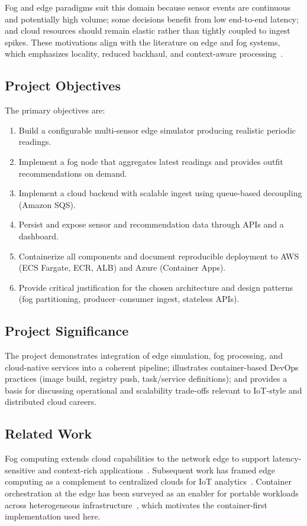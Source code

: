 \documentclass[conference]{IEEEtran}
\begin{document}
Fog and edge paradigms suit this domain because sensor events are continuous and potentially high volume; some decisions benefit from low end-to-end latency; and cloud resources should remain elastic rather than tightly coupled to ingest spikes. These motivations align with the literature on edge and fog systems, which emphasizes locality, reduced backhaul, and context-aware processing~\cite{bonomi2012,shi2016}.

\subsection{Project Objectives}
The primary objectives are:
\begin{enumerate}
  \item Build a configurable multi-sensor edge simulator producing realistic periodic readings.
  \item Implement a fog node that aggregates latest readings and provides outfit recommendations on demand.
  \item Implement a cloud backend with scalable ingest using queue-based decoupling (Amazon SQS).
  \item Persist and expose sensor and recommendation data through APIs and a dashboard.
  \item Containerize all components and document reproducible deployment to AWS (ECS Fargate, ECR, ALB) and Azure (Container Apps).
  \item Provide critical justification for the chosen architecture and design patterns (fog partitioning, producer--consumer ingest, stateless APIs).
\end{enumerate}

\subsection{Project Significance}
The project demonstrates integration of edge simulation, fog processing, and cloud-native services into a coherent pipeline; illustrates container-based DevOps practices (image build, registry push, task/service definitions); and provides a basis for discussing operational and scalability trade-offs relevant to IoT-style and distributed cloud careers.

\subsection{Related Work}
Fog computing extends cloud capabilities to the network edge to support latency-sensitive and context-rich applications~\cite{bonomi2012}. Subsequent work has framed edge computing as a complement to centralized clouds for IoT analytics~\cite{shi2016}. Container orchestration at the edge has been surveyed as an enabler for portable workloads across heterogeneous infrastructure~\cite{pahl2015}, which motivates the container-first implementation used here.
\end{document}
